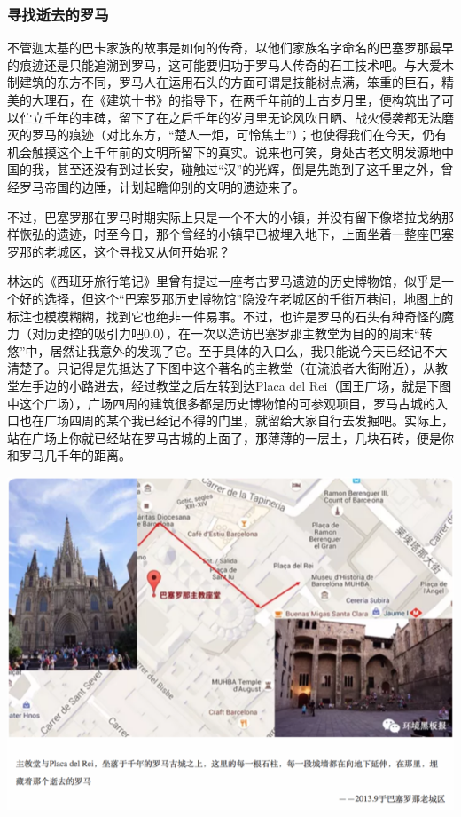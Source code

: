 \documentclass[]{book}
\begin{document}
\subsubsection{寻找逝去的罗马}

不管迦太基的巴卡家族的故事是如何的传奇，以他们家族名字命名的巴塞罗那最早的痕迹还是只能追溯到罗马，这可能要归功于罗马人传奇的石工技术吧。与大爱木制建筑的东方不同，罗马人在运用石头的方面可谓是技能树点满，笨重的巨石，精美的大理石，在《建筑十书》的指导下，在两千年前的上古岁月里，便构筑出了可以伫立千年的丰碑，留下了在之后千年的岁月里无论风吹日晒、战火侵袭都无法磨灭的罗马的痕迹（对比东方，``楚人一炬，可怜焦土''）；也使得我们在今天，仍有机会触摸这个上千年前的文明所留下的真实。说来也可笑，身处古老文明发源地中国的我，甚至还没有到过长安，碰触过``汉''的光辉，倒是先跑到了这千里之外，曾经罗马帝国的边陲，计划起瞻仰别的文明的遗迹来了。

不过，巴塞罗那在罗马时期实际上只是一个不大的小镇，并没有留下像塔拉戈纳那样恢弘的遗迹，时至今日，那个曾经的小镇早已被埋入地下，上面坐着一整座巴塞罗那的老城区，这个寻找又从何开始呢？

林达的《西班牙旅行笔记》里曾有提过一座考古罗马遗迹的历史博物馆，似乎是一个好的选择，但这个``巴塞罗那历史博物馆''隐没在老城区的千街万巷间，地图上的标注也模模糊糊，找到它也绝非一件易事。不过，也许是罗马的石头有种奇怪的魔力（对历史控的吸引力吧0.0），在一次以造访巴塞罗那主教堂为目的的周末``转悠''中，居然让我意外的发现了它。至于具体的入口么，我只能说今天已经记不大清楚了。只记得是先抵达了下图中这个著名的主教堂（在流浪者大街附近），从教堂左手边的小路进去，经过教堂之后左转到达Placa
del
Rei（国王广场，就是下图中这个广场），广场四周的建筑很多都是历史博物馆的可参观项目，罗马古城的入口也在广场四周的某个我已经记不得的门里，就留给大家自行去发掘吧。实际上，站在广场上你就已经站在罗马古城的上面了，那薄薄的一层土，几块石砖，便是你和罗马几千年的距离。

\includegraphics[width=8.33in]{images/xt13}
\end{document}
